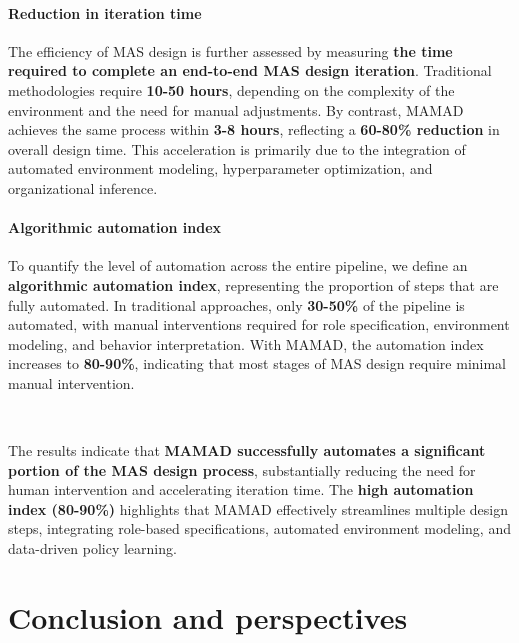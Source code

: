 \documentclass[pdflatex,sn-mathphys-num]{sn-jnl}%
\theoremstyle{thmstyleone}%
\theoremstyle{thmstyletwo}%
\theoremstyle{thmstylethree}%
\begin{document}
\paragraph{Reduction in iteration time}
The efficiency of MAS design is further assessed by measuring \textbf{the time required to complete an end-to-end MAS design iteration}. Traditional methodologies require \textbf{10-50 hours}, depending on the complexity of the environment and the need for manual adjustments. By contrast, MAMAD achieves the same process within \textbf{3-8 hours}, reflecting a \textbf{60-80\% reduction} in overall design time. This acceleration is primarily due to the integration of automated environment modeling, hyperparameter optimization, and organizational inference.

\paragraph{Algorithmic automation index}
To quantify the level of automation across the entire pipeline, we define an \textbf{algorithmic automation index}, representing the proportion of steps that are fully automated. In traditional approaches, only \textbf{30-50\%} of the pipeline is automated, with manual interventions required for role specification, environment modeling, and behavior interpretation. With MAMAD, the automation index increases to \textbf{80-90\%}, indicating that most stages of MAS design require minimal manual intervention.

\

The results indicate that \textbf{MAMAD successfully automates a significant portion of the MAS design process}, substantially reducing the need for human intervention and accelerating iteration time. The \textbf{high automation index (80-90\%)} highlights that MAMAD effectively streamlines multiple design steps, integrating role-based specifications, automated environment modeling, and data-driven policy learning.

\clearpage

\section{Conclusion and perspectives}\label{sec:conclusion}
\end{document}
